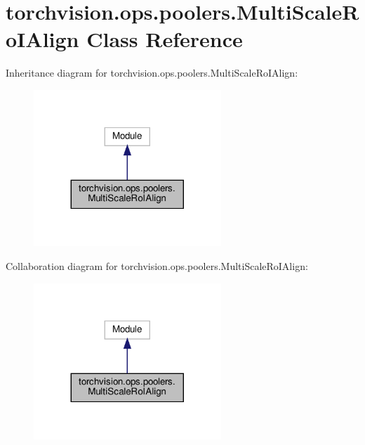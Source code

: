 \hypertarget{classtorchvision_1_1ops_1_1poolers_1_1MultiScaleRoIAlign}{}\section{torchvision.\+ops.\+poolers.\+Multi\+Scale\+Ro\+I\+Align Class Reference}
\label{classtorchvision_1_1ops_1_1poolers_1_1MultiScaleRoIAlign}


Inheritance diagram for torchvision.\+ops.\+poolers.\+Multi\+Scale\+Ro\+I\+Align\+:
\nopagebreak
\begin{figure}[H]
\begin{center}
\leavevmode
\includegraphics[width=200pt]{classtorchvision_1_1ops_1_1poolers_1_1MultiScaleRoIAlign__inherit__graph}
\end{center}
\end{figure}


Collaboration diagram for torchvision.\+ops.\+poolers.\+Multi\+Scale\+Ro\+I\+Align\+:
\nopagebreak
\begin{figure}[H]
\begin{center}
\leavevmode
\includegraphics[width=200pt]{classtorchvision_1_1ops_1_1poolers_1_1MultiScaleRoIAlign__coll__graph}
\end{center}
\end{figure}
